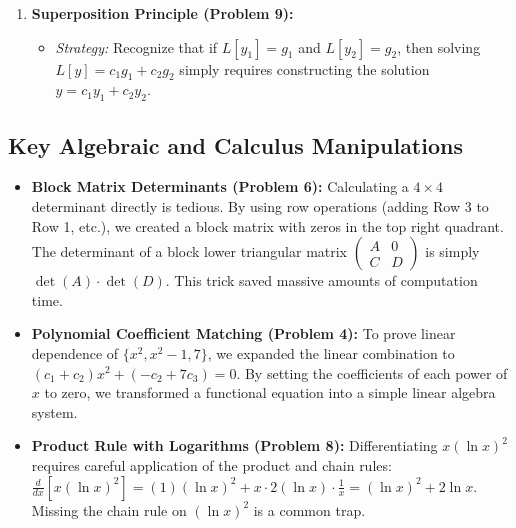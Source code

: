 \documentclass[11pt, a4paper]{article}
\theoremstyle{definition}
\theoremstyle{remark}
\begin{document}
\begin{enumerate}
    \begin{itemize}
        \item \textit{Strategy:} Construct the general solution $y = y_c + y_p$. Differentiate this general solution $n-1$ times. Plug in the initial value $x_0$ to create a system of $n$ linear equations. Solve for $c_1, \dots, c_n$ and substitute back.
    \end{itemize}
    \item \textbf{Superposition Principle (Problem 9):}
    \begin{itemize}
        \item \textit{Strategy:} Recognize that if $L[y_1] = g_1$ and $L[y_2] = g_2$, then solving $L[y] = c_1 g_1 + c_2 g_2$ simply requires constructing the solution $y = c_1 y_1 + c_2 y_2$.
    \end{itemize}
\end{enumerate}

\subsection{Key Algebraic and Calculus Manipulations}
\begin{itemize}
    \item \textbf{Block Matrix Determinants (Problem 6):} Calculating a $4 \times 4$ determinant directly is tedious. By using row operations (adding Row 3 to Row 1, etc.), we created a block matrix with zeros in the top right quadrant. The determinant of a block lower triangular matrix $\begin{pmatrix} A & 0 \\ C & D \end{pmatrix}$ is simply $\det(A) \cdot \det(D)$. This trick saved massive amounts of computation time.
    \item \textbf{Polynomial Coefficient Matching (Problem 4):} To prove linear dependence of $\{x^2, x^2-1, 7\}$, we expanded the linear combination to $(c_1+c_2)x^2 + (-c_2+7c_3) = 0$. By setting the coefficients of each power of $x$ to zero, we transformed a functional equation into a simple linear algebra system.
    \item \textbf{Product Rule with Logarithms (Problem 8):} Differentiating $x(\ln x)^2$ requires careful application of the product and chain rules: $\frac{d}{dx}[x(\ln x)^2] = (1)(\ln x)^2 + x \cdot 2(\ln x) \cdot \frac{1}{x} = (\ln x)^2 + 2\ln x$. Missing the chain rule on $(\ln x)^2$ is a common trap.
\end{itemize}
\end{document}

